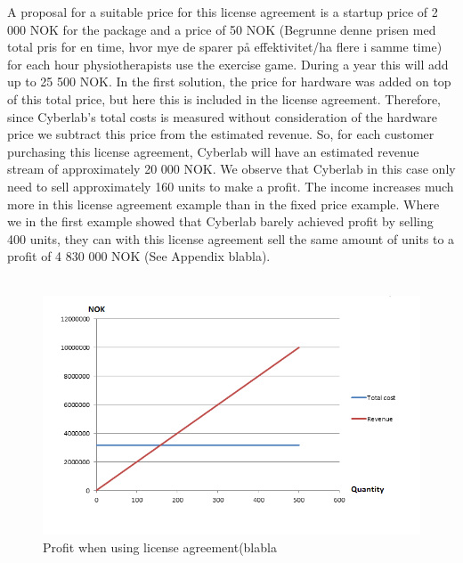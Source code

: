 A proposal for a suitable price for this license agreement is a startup price of 2 000 NOK for the package and a price of 50 NOK (Begrunne denne prisen med total pris for en time, hvor mye de sparer p{å} effektivitet/ha flere i samme time) for each hour physiotherapists use the exercise game. During a year this will add up to 25 500 NOK. In the first solution, the price for hardware was added on top of this total price, but here this is included in the license agreement. Therefore, since Cyberlab’s total costs is measured without consideration of the hardware price we subtract this price from the estimated revenue. So, for each customer purchasing this license agreement, Cyberlab will have an estimated revenue stream of approximately 20 000 NOK. We observe that Cyberlab in this case only need to sell approximately 160 units to make a profit. The income increases much more in this license agreement example than in the fixed price example. Where we in the first example showed that Cyberlab barely achieved profit by selling 400 units, they can with this license agreement sell the same amount of units to a profit of 4 830 000 NOK (See Appendix blabla). \\ \\	
\begin{figure}
\label{fig:RevenueStreamLicense}
\begin{center}
\includegraphics[scale=0.8]{revenuestreamlicense}
\caption[License example]{Profit when using license agreement(blabla}
\end{center}
\end{figure}
